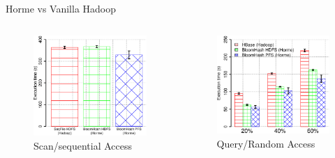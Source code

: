 \documentclass[newPxFont]{beamer}
\begin{document}
\begin{frame}[c]{Horme vs Vanilla Hadoop}
\vspace{-1.5cm}
\begin{columns}[T] %
    \begin{column}{.48\textwidth}
    \begin{figure}[ht!]
      \includegraphics[scale=0.3]{eval-scan}
      \centering
      \caption{Scan/sequential Access}
    \end{figure}
    \end{column}%
    \hfill%
    \begin{column}{.48\textwidth}
    \begin{figure}[ht!]
      \includegraphics[scale=0.3]{eval-random}
      \centering
      \caption{Query/Random Access}
    \end{figure} 
    \end{column}%
\end{columns}  
\end{frame}
\end{document}
